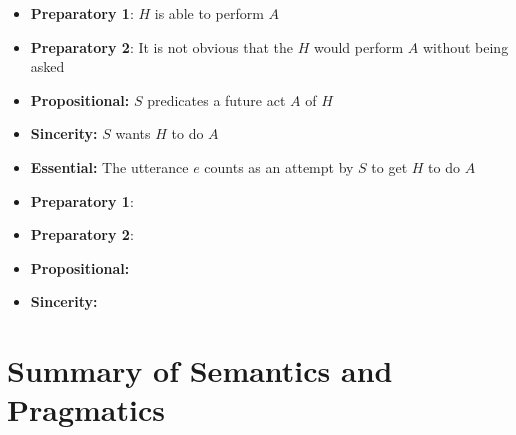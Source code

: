 \documentclass[a4paper,landscape,headrule,footrule,xetex]{foils}
\begin{document}

  \begin{itemize}
\item \textbf{Preparatory 1}: $H$ is able to perform  $A$
\item \textbf{Preparatory 2}: It is not obvious that the $H$ would perform $A$  without being asked
\item \textbf{Propositional:} $S$ predicates a future act $A$ of $H$
\item \textbf{Sincerity:}  $S$ wants $H$ to do $A$ 
\item \textbf{Essential:} The utterance $e$ counts as an attempt by $S$ to get $H$ to do $A$
\end{itemize}
  \begin{itemize}
\item \textbf{Preparatory 1}: 
\item \textbf{Preparatory 2}: 
\item \textbf{Propositional:} 
\item \textbf{Sincerity:}  
\end{itemize}


\section{Summary of Semantics and Pragmatics}
\end{document}

